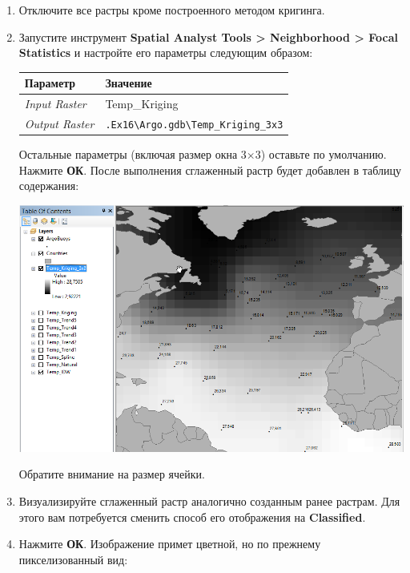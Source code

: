 \documentclass[]{book}
\theoremstyle{definition}
\theoremstyle{definition}
\theoremstyle{definition}
\theoremstyle{remark}
\begin{document}
\begin{enumerate}
\def\labelenumi{\arabic{enumi}.}
\item
  Отключите все растры кроме построенного методом кригинга.
\item
  Запустите инструмент \textbf{Spatial Analyst Tools \textgreater{}
  Neighborhood \textgreater{} Focal Statistics} и настройте его
  параметры следующим образом:

  \begin{longtable}[]{@{}ll@{}}
  \toprule
  Параметр & Значение\tabularnewline
  \midrule
  \endhead
  \emph{Input Raster} & Temp\_Kriging\tabularnewline
  \emph{Output Raster} &
  \texttt{.Ex16\textbackslash{}Argo.gdb\textbackslash{}Temp\_Kriging\_3x3}\tabularnewline
  \bottomrule
  \end{longtable}

  Остальные параметры (включая размер окна 3×3) оставьте по умолчанию.
  Нажмите \textbf{ОК}. После выполнения сглаженный растр будет добавлен
  в таблицу содержания:

  \includegraphics{images/Ex16/image13.png}

  Обратите внимание на размер ячейки.
\item
  Визуализируйте сглаженный растр аналогично созданным ранее растрам.
  Для этого вам потребуется сменить способ его отображения на
  \textbf{Classified}.
\item
  Нажмите \textbf{ОК}. Изображение примет цветной, но по прежнему
  пикселизованный вид:


\end{enumerate}
\end{document}
